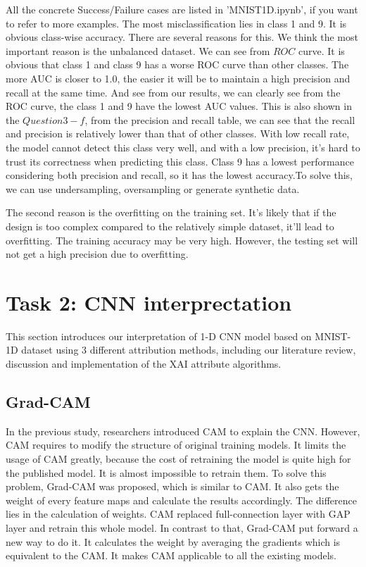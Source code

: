 \documentclass[conference]{IEEEtran}
\begin{document}
	All the concrete Success/Failure cases are listed in 'MNIST1D.ipynb', if you want to refer to more examples.
	The most misclassification lies in class 1 and 9. It is obvious class-wise accuracy.
    There are several reasons for this. We think the most important reason is the unbalanced dataset. 
    We can see from $ROC$ curve. It is obvious that class 1 and class 9 has a worse ROC curve than other classes.
    The more AUC is closer to 1.0, the easier it will be to maintain a high precision and recall at the same time.
    And see from our results, we can clearly see from the ROC curve, the class 1 and 9 have the lowest AUC values.
    This is also shown in the $Question 3-f$, from the precision and recall table, we can see that the recall and precision is relatively lower than that of other classes.
    With low recall rate, the model cannot detect this class very well, and with a low precision, it's hard to trust its correctness when predicting this class.
    Class 9 has a lowest performance considering both precision and recall, so it has the lowest accuracy.To solve this, we can use undersampling, oversampling or generate synthetic data.\par
    The second reason is the overfitting on the training set. It's likely that if the design is too complex compared to the relatively simple dataset, it'll lead to overfitting. The training accuracy may be very high. However, the testing set will not get a high precision due to overfitting.


\section{Task 2: CNN interprectation}

This section introduces our interpretation of 1-D CNN model based on MNIST-1D dataset using 3 different attribution methods, including our literature review, discussion and implementation of the XAI attribute algorithms.

\subsection{Grad-CAM}
In the previous study, researchers introduced CAM to explain the CNN. However, CAM requires to modify the structure of original training models. It limits the usage of CAM greatly, because the cost of retraining the model is quite high for the published model. It is almost impossible to retrain them.
To solve this problem, Grad-CAM was proposed, which is similar to CAM. It also gets the weight of every feature maps and calculate the results accordingly. The difference lies in the calculation of weights. CAM replaced full-connection layer with GAP layer and retrain this whole model. In contrast to that, Grad-CAM put forward a new way to do it.
It calculates the weight by averaging the gradients which is equivalent to the CAM. It makes CAM applicable to all the existing models.\par
\end{document}
